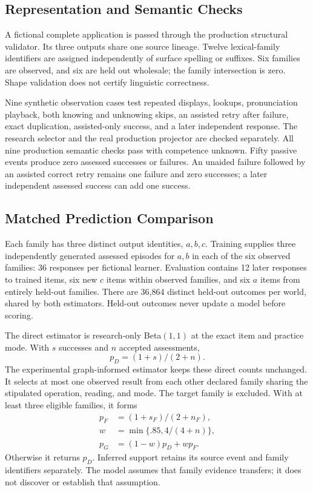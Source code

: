 \documentclass{article}
\begin{document}
\subsection{Representation and Semantic Checks}

A fictional complete application is passed through the production structural validator. Its three outputs share one source lineage. Twelve lexical-family identifiers are assigned independently of surface spelling or suffixes. Six families are observed, and six are held out wholesale; the family intersection is zero. Shape validation does not certify linguistic correctness.

Nine synthetic observation cases test repeated displays, lookups, pronunciation playback, both knowing and unknowing skips, an assisted retry after failure, exact duplication, assisted-only success, and a later independent response. The research selector and the real production projector are checked separately. All nine production semantic checks pass with competence unknown. Fifty passive events produce zero assessed successes or failures. An unaided failure followed by an assisted correct retry remains one failure and zero successes; a later independent assessed success can add one success.

\subsection{Matched Prediction Comparison}

Each family has three distinct output identities, $a,b,c$. Training supplies three independently generated assessed episodes for $a,b$ in each of the six observed families: 36 responses per fictional learner. Evaluation contains 12 later responses to trained items, six new $c$ items within observed families, and six $a$ items from entirely held-out families. There are 36,864 distinct held-out outcomes per world, shared by both estimators. Held-out outcomes never update a model before scoring.

The direct estimator is research-only Beta$(1,1)$ at the exact item and practice mode. With $s$ successes and $n$ accepted assessments,
\begin{equation}
 p_D=(1+s)/(2+n).
\end{equation}
The experimental graph-informed estimator keeps these direct counts unchanged. It selects at most one observed result from each other declared family sharing the stipulated operation, reading, and mode. The target family is excluded. With at least three eligible families, it forms
\begin{align}
 p_F&=(1+s_F)/(2+n_F),\\
 w&=\min\{.85,4/(4+n)\},\\
 p_G&=(1-w)p_D+wp_F.
\end{align}
Otherwise it returns $p_D$. Inferred support retains its source event and family identifiers separately. The model assumes that family evidence transfers; it does not discover or establish that assumption.
\end{document}
